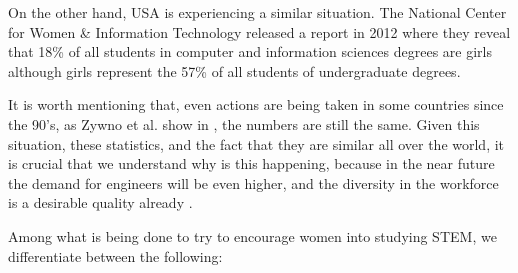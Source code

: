 \documentclass[journal,transmag]{IEEEtran}
\begin{document}
On the other hand, USA is experiencing a similar situation. The National Center for Women \& Information Technology released a report in 2012 \cite{NCWIT::stats} where they reveal that 18\% of all students in computer and information sciences degrees are girls although girls represent the 57\% of all students of undergraduate degrees.

It is worth mentioning that, even actions are being taken in some countries since the 90's, as Zywno et al. show in \cite{zywno1999attracting}, the numbers are still the same. Given this situation, these statistics, and the fact that they are similar all over the world, it is crucial that we understand why is this happening, because in the near future the demand for engineers will be even higher, and the diversity in the workforce is a desirable quality already \cite{wilson1992benefits}. 

Among what is being done to try to encourage women into studying STEM, we differentiate between the following:
\end{document}
